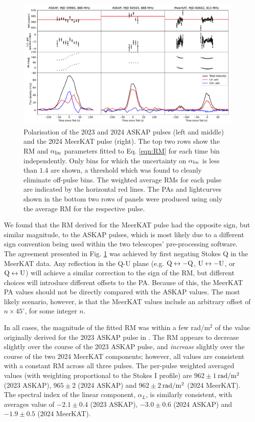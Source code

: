 \documentclass[preprint2,linenumbers]{aastex631}
\begin{document}
\begin{figure}[th]
    \centering
    \includegraphics[width=0.98\linewidth]{RM.pdf}
    \caption{Polarisation of the 2023 and 2024 ASKAP pulses (left and middle) and the 2024 MeerKAT pulse (right). The top two rows show the RM and $\alpha_{\rm lin}$ parameters fitted to Eq. \eqref{eqn:RM} for each time bin independently. Only bins for which the uncertainty on $\alpha_{\rm lin}$ is less than $1.4$ are shown, a threshold which was found to cleanly eliminate off-pulse bins. The weighted average RMs for each pulse are indicated by the horizontal red lines. The PAs and lightcurves shown in the bottom two rows of panels were produced using only the average RM for the respective pulse.}
    \label{fig:RM}
\end{figure}

We found that the RM derived for the MeerKAT pulse had the opposite sign, but similar magnitude, to the ASKAP pulses, which is most likely due to a different sign convention being used within the two telescopes' pre-processing software.
The agreement presented in Fig. \ref{fig:RM} was achieved by first negating Stokes Q in the MeerKAT data.
Any reflection in the Q-U plane (e.g. ${\rm Q} \leftrightarrow -{\rm Q}$, ${\rm U} \leftrightarrow -{\rm U}$, or ${\rm Q} \leftrightarrow {\rm U}$) will achieve a similar correction to the sign of the RM, but different choices will introduce different offsets to the PA.
Because of this, the MeerKAT PA values should not be directly compared with the ASKAP values.
The most likely scenario, however, is that the MeerKAT values include an arbitrary offset of $n \times 45^\circ$, for some integer $n$.

In all cases, the magnitude of the fitted RM was within a few rad/m$^2$ of the value originally derived for the 2023 ASKAP pulse in .
The RM appears to decrease slightly over the course of the 2023 ASKAP pulse, and \emph{increase} slightly over the course of the two 2024 MeerKAT components; however, all values are consistent with a constant RM across all three pulses.
The per-pulse weighted averaged values (with weighting proportional to the Stokes I profile) are $962 \pm 1$\,${\rm rad}/{\rm m}^2$ (2023 ASKAP), $965 \pm 2$ (2024 ASKAP) and $962 \pm 2$\,${\rm rad}/{\rm m}^2$ (2024 MeerKAT).
The spectral index of the linear component, $\alpha_L$, is similarly consistent, with averages value of $-2.1 \pm 0.4$ (2023 ASKAP), $-3.0 \pm 0.6$ (2024 ASKAP) and $-1.9 \pm 0.5$ (2024 MeerKAT).
\end{document}
